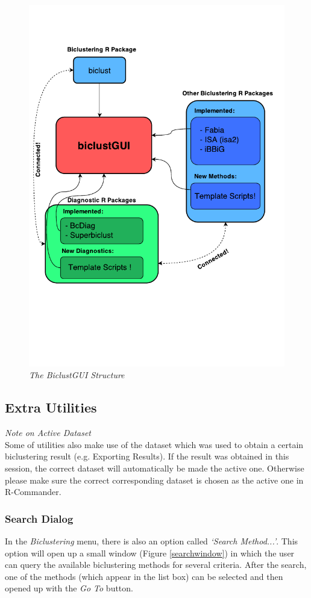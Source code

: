 \documentclass[a4paper]{article}\usepackage[]{graphicx}\usepackage[]{color}
\begin{document}
\begin{figure}[H]
\centering
\includegraphics[scale=0.9]{figures/biclustGUI_diagram.pdf}
\caption{{\it The BiclustGUI Structure }\label{biclustGUI_struc}}
\end{figure}

\subsection{Extra Utilities}
{\it Note on Active Dataset}\\
Some of utilities also make use of the dataset which was used to obtain a
certain biclustering result (e.g. Exporting Results). If the result was obtained in this
session, the correct dataset will automatically be made the active one.
Otherwise please make sure the correct corresponding dataset is chosen as the
active one in R-Commander.
\subsubsection{Search Dialog}
In the {\it Biclustering} menu, there is also an option called {\it `Search
Method...'}. This option will open up a small window (Figure
\ref{searchwindow}) in which the user can query the available biclustering
methods for several criteria. After the search, one of the methods (which appear
in the list box) can be selected and then opened up with the {\it Go To} button.
\end{document}
